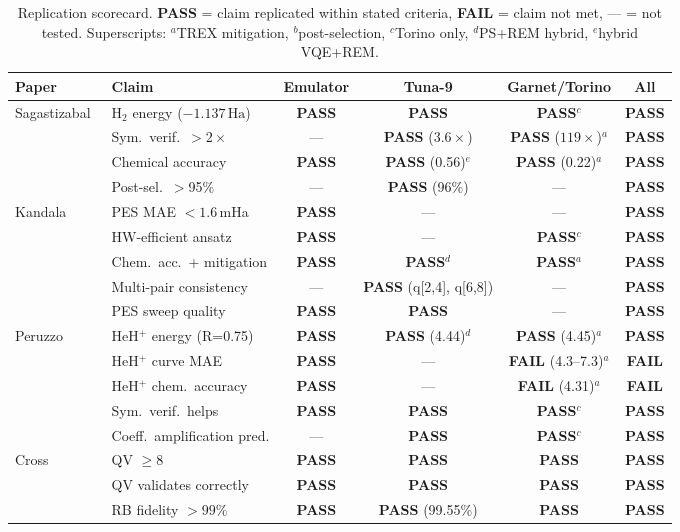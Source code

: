 \documentclass[twocolumn,prl,superscriptaddress,nofootinbib]{revtex4-2}
\newcommand{\PASS}{\textcolor{pass}{\textbf{PASS}}}
\newcommand{\FAIL}{\textcolor{fail}{\textbf{FAIL}}}
\newcommand{\Ha}{\,\text{Ha}}
\begin{document}
\begin{table}
\caption{Replication scorecard. \PASS{} = claim replicated within stated criteria, \FAIL{} = claim not met, --- = not tested.
Superscripts: $^a$TREX mitigation, $^b$post-selection, $^c$Torino only, $^d$PS+REM hybrid, $^e$hybrid VQE+REM.}
\label{tab:replication}
\begin{ruledtabular}
\footnotesize
\begin{tabular}{llcccc}
Paper & Claim & Emulator & Tuna-9 & Garnet/Torino & All \\
\midrule
\multirow{4}{*}{Sagastizabal~\cite{sagastizabal2019}}
  & H$_2$ energy ($-1.137\Ha$) & \PASS & \PASS & \PASS$^c$ & \PASS \\
  & Sym.\ verif.\ $>2\times$ & --- & \PASS{} ($3.6\times$) & \PASS{} ($119\times$)$^a$ & \PASS \\
  & Chemical accuracy & \PASS & \PASS{} (0.56)$^e$ & \PASS{} (0.22)$^a$ & \PASS \\
  & Post-sel.\ $>$95\% & --- & \PASS{} (96\%) & --- & \PASS \\
\midrule
\multirow{5}{*}{Kandala~\cite{kandala2017}}
  & PES MAE $<1.6$\,mHa & \PASS & --- & --- & \PASS \\
  & HW-efficient ansatz & \PASS & --- & \PASS$^c$ & \PASS \\
  & Chem.\ acc.\ + mitigation & \PASS & \PASS$^d$ & \PASS$^a$ & \PASS \\
  & Multi-pair consistency & --- & \PASS{} (q[2,4], q[6,8]) & --- & \PASS \\
  & PES sweep quality & \PASS & \PASS & --- & \PASS \\
\midrule
\multirow{5}{*}{Peruzzo~\cite{peruzzo2014}}
  & HeH$^+$ energy (R=0.75) & \PASS & \PASS{} (4.44)$^d$ & \PASS{} (4.45)$^a$ & \PASS \\
  & HeH$^+$ curve MAE & \PASS & --- & \FAIL{} (4.3--7.3)$^a$ & \FAIL \\
  & HeH$^+$ chem.\ accuracy & \PASS & --- & \FAIL{} (4.31)$^a$ & \FAIL \\
  & Sym.\ verif.\ helps & \PASS & \PASS & \PASS$^c$ & \PASS \\
  & Coeff.\ amplification pred. & --- & \PASS & \PASS$^c$ & \PASS \\
\midrule
\multirow{3}{*}{Cross~\cite{cross2019}}
  & QV $\geq 8$ & \PASS & \PASS & \PASS & \PASS \\
  & QV validates correctly & \PASS & \PASS & \PASS & \PASS \\
  & RB fidelity $> 99\%$ & \PASS & \PASS{} (99.55\%) & \PASS & \PASS \\

\end{tabular}
\end{ruledtabular}
\end{table}
\end{document}
